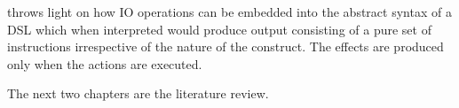 \documentclass[thesis-solanki.tex]{subfiles}
\begin{document}
 throws light on how IO operations can be embedded into the abstract syntax
of a DSL which when interpreted would produce output consisting of a pure set of instructions irrespective of the
nature of the construct.
The effects are produced only when the actions are executed.


The next two chapters are the literature review.

\ifMain\ifDraft
\begin{scope}
  \nolinenumbers
  \enotesize
  \par
  \begin{singlespace}
  \setlength{\parskip}{12pt plus 2pt minus 1pt}
  \theendnotes
  \par
  \end{singlespace}
\end{scope}
\fi\fi
\end{document}
